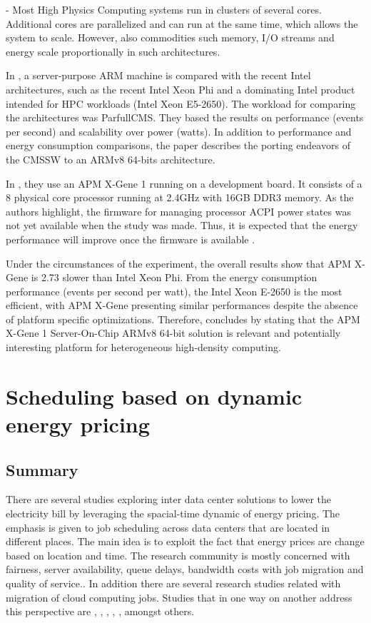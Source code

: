 - Most High Physics Computing systems run in clusters of several cores.
Additional cores are parallelized and can run at the same time, which allows the
system to scale. However, also commodities such memory, I/O streams and energy
scale proportionally in such architectures.
 

% 
In \cite{ACAT14ARMDAVID}, a server-purpose ARM machine is compared with the recent
Intel architectures, such as the recent Intel Xeon Phi and a dominating Intel product
intended for HPC workloads (Intel Xeon E5-2650). The workload for comparing
the architectures was ParfullCMS. They based the results on performance (events per
second) and scalability over power (watts). In addition to performance and energy
consumption comparisons, the paper describes the porting endeavors of the CMSSW to
an ARMv8 64-bits architecture.


In \cite{ACAT14ARMDAVID}, they use an APM X-Gene 1 running on a development board. 
It consists of a 8 physical core processor running at 2.4GHz with 16GB DDR3 memory.
As the authors highlight, the firmware for managing processor ACPI power states was
not yet available when the study was made. Thus, it is expected that the energy 
performance will improve once the firmware is available \cite{ACAT14ARMDAVID}.

Under the circumstances of the experiment, the overall results show that APM X-Gene 
is 2.73 slower than Intel Xeon Phi. From the energy consumption performance (events
per second per watt), the Intel Xeon E-2650 is the most efficient, with APM X-Gene
presenting similar performances despite the absence of platform specific 
optimizations. Therefore, \cite{ACAT14ARMDAVID} concludes by stating that the APM
X-Gene 1 Server-On-Chip ARMv8 64-bit solution is relevant and potentially interesting
platform for heterogeneous high-density computing. 


\section{Scheduling based on dynamic energy pricing}

\subsection{Summary}

There are several studies exploring inter data center solutions to lower
the electricity bill by leveraging the spacial-time dynamic of energy pricing. The 
emphasis is given to job scheduling across data centers that are located in 
different places. The main idea is to exploit the fact that energy prices 
are change based on location and time. The research community is mostly concerned 
with fairness, server availability, queue delays, bandwidth costs with job migration
and quality of service.. In addition there are several research studies related with 
migration of cloud computing jobs. Studies that in one way on another address this 
perspective are \cite{EFF_JOB_SCHEDULING}, \cite{MIGRATION_CLOUD}, 
\cite{MINIMIZING_DIST}, \cite{CUTTING_BILL}, \cite{SCHED_HETEROGE}, amongst others. 

